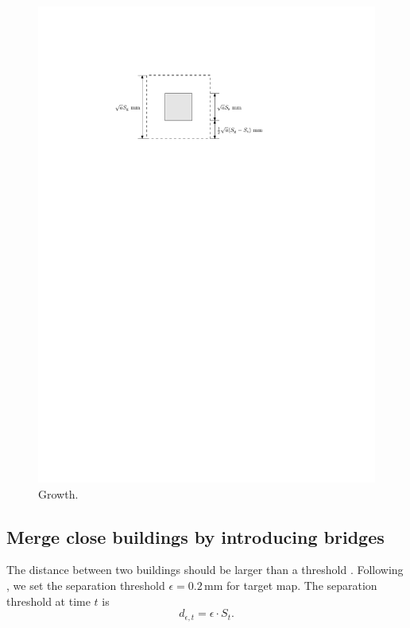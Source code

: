 \documentclass[graybox]{svmult}
\begin{document}
\begin{figure}[tb]
	\centering
	\includegraphics{Growth}
	\caption{Growth.}
	\label{fig:Growth}
\end{figure}


\subsection{Merge close buildings by introducing bridges}
The distance between two buildings should be larger than a threshold
\parencite{Regnauld2001,Li2004}.
Following \textcite{Basaraner2008,Stoter2009}, 
we set the separation threshold $\epsilon= 0.2\,\mathrm{mm}$ for target map. 
The separation threshold at time $t$ is
\begin{equation}
\label{eq:d_epsilont}
d_{\epsilon, t} = \epsilon \cdot S_t.
\end{equation}
\end{document}
